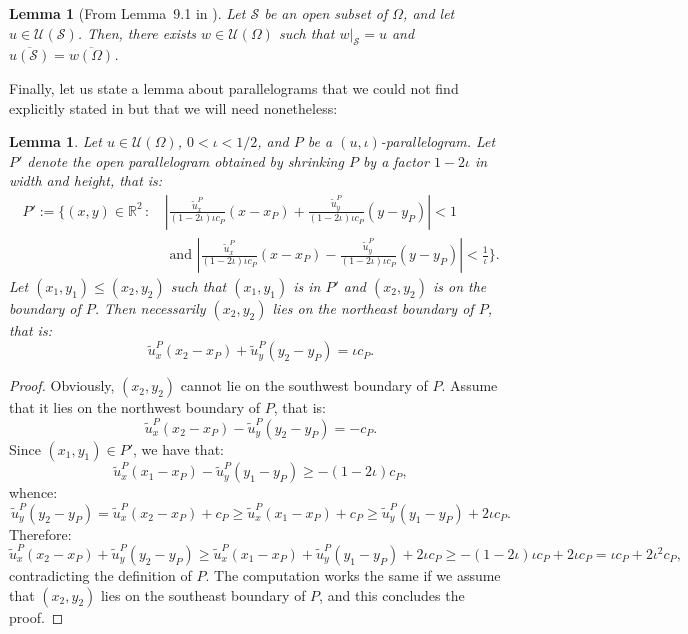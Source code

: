 \documentclass{article}
\newtheorem{lem}[theorem]{Lemma}
\theoremstyle{remark}
\def\R{\mathbb{R}}
\def\m{\!-\!}
\newcommand{\card}[1]{\left|#1\right|}
\def\Usjo{\mathcal{U}}
\begin{document}
\begin{lem}[From Lemma~9.1 in \cite{S23}]\label{lem: Sjo patch doubly increasing}
    Let $\mathcal{S}$ be an open subset of $\Omega$, and let $u\in\Usjo(\mathcal{S})$.
    Then, there exists $w\in\Usjo(\Omega)$ such that $w\vert_{\mathcal{S}} = u$ and $\overline{u(\mathcal{S})} = \overline{w(\Omega)}$.
\end{lem}

Finally, let us state a lemma about parallelograms that we could not find explicitly stated in \cite{S23} but that we will need nonetheless:

\begin{lem}\label{lem: boundaries of parallelogram}
    Let $u\in\Usjo(\Omega)$, $0<\iota<1/2$, and $P$ be a $(u,\iota)$-parallelogram.
    Let $P'$ denote the open parallelogram obtained by shrinking $P$ by a factor $1\m2\iota$ in width and height, that is:
    \begin{align*}
        P' := \Bigg\{ (x,y)\in\R^2 \,:\, 
        &\card{ \frac{\widetilde u_x^P}{(1-2\iota)\iota c_P} (x-x_P) + \frac{\widetilde u_y^P}{(1-2\iota)\iota c_P} (y-y_P) } < 1 
        \\&\text{ and } \card{ \frac{\widetilde u_x^P}{(1-2\iota)\iota c_P} (x-x_P) - \frac{\widetilde u_y^P}{(1-2\iota)\iota c_P} (y-y_P) } < \frac{1}{\iota} \Bigg\} .
    \end{align*}
    Let $(x_1,y_1) \le (x_2,y_2)$ such that $(x_1,y_1)$ is in $P'$ and $(x_2,y_2)$ is on the boundary of $P$.
    Then necessarily $(x_2,y_2)$ lies on the northeast boundary of $P$, that is:
    \[
        \widetilde u_x^P (x_2-x_P) + \widetilde u_y^P (y_2-y_P) = \iota c_P .
    \]
\end{lem}

\begin{proof}
    Obviously, $(x_2,y_2)$ cannot lie on the southwest boundary of $P$.
    Assume that it lies on the northwest boundary of $P$, that is:
    \[
        \widetilde u_x^P (x_2-x_P) - \widetilde u_y^P (y_2-y_P) = -c_P .
    \]
    Since $(x_1,y_1)\in P'$, we have that:
    \[
        \widetilde u_x^P (x_1-x_P) - \widetilde u_y^P (y_1-y_P) \ge -(1-2\iota)c_P ,
    \]
    whence:
    \[
        \widetilde u_y^P (y_2-y_P) 
        = \widetilde u_x^P (x_2-x_P) + c_P
        \ge \widetilde u_x^P (x_1-x_P) + c_P
        \ge \widetilde u_y^P (y_1-y_P) + 2\iota c_P .
    \]
    Therefore:
    \[
        \widetilde u_x^P (x_2-x_P) + \widetilde u_y^P (y_2-y_P)
        \ge \widetilde u_x^P (x_1-x_P) + \widetilde u_y^P (y_1-y_P) + 2\iota c_P
        \ge -(1-2\iota)\iota c_P + 2\iota c_P
        = \iota c_P + 2\iota^2 c_P,
    \]
    contradicting the definition of $P$.
    The computation works the same if we assume that $(x_2,y_2)$ lies on the southeast boundary of $P$, and this concludes the proof.
\end{proof}
\end{document}
